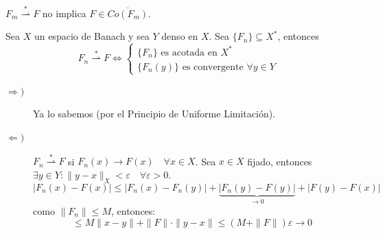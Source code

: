 \begin{observacion}
    $F_m \overset{*}{\rightharpoonup} F$ no implica $F\in \overline{Co(F_m)}$.
\end{observacion}

\begin{ejercicio}
    Sea $X$ un espacio de Banach y sea $Y$ denso en $X$. Sea $\{F_n\} \subseteq X^*$, entonces
    \begin{equation*}
        F_n \overset{*}{\rightharpoonup} F \iff \begin{cases} \{F_n\} \text{ es acotada en } X^* \\ \{F_n(y)\} \text{ es convergente } \forall y \in Y \end{cases}
    \end{equation*}
    \begin{description}
        \item[$\Longrightarrow)$] Ya lo sabemos (por el Principio de Uniforme Limitación).
        \item[$\Longleftarrow)$] $F_n \overset{*}{\rightharpoonup} F$ si $F_n(x) \longrightarrow F(x) \quad \forall x \in X$. Sea $x \in X$ fijado, entonces \mbox{$\exists y \in Y : \|y - x\|_X < \varepsilon \quad \forall \varepsilon > 0$}.
        \[ |F_n(x) - F(x)| \le |F_n(x) - F_n(y)| + \underbrace{|F_n(y) - F(y)|}_{\to 0} + |F(y) - F(x)| \]
        como $\|F_n\| \le M$, entonces:
        \[ \le M \|x - y\| + \|F\| \cdot \|y - x\| \le (M + \|F\|) \varepsilon \longrightarrow 0 \]
    \end{description}
\end{ejercicio}

